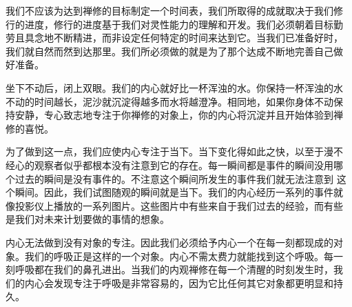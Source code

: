 我们不应该为达到禅修的目标制定一个时间表，我们所取得的成就取决于我们修
行的进度，修行的进度基于我们对灵性能力的理解和开发。我们必须朝着目标勤
劳且具念地不断精进，而非设定任何特定的时间来达到它。当我们已准备好时，
我们就自然而然到达那里。我们所必须做的就是为了那个达成不断地完善自己做
好准备。

坐下不动后，闭上双眼。我们的内心就好比一杯浑浊的水。你保持一杯浑浊的水
不动的时间越长，泥沙就沉淀得越多而水将越澄净。相同地，如果你身体不动保
持安静，专心致志地专注于你禅修的对象上，你的内心将沉淀并且开始体验到禅
修的喜悦。

为了做到这一点，我们应使内心专注于当下。当下变化得如此之快，以至于漫不
经心的观察者似乎都根本没有注意到它的存在。每一瞬间都是事件的瞬间没用哪
个过去的瞬间是没有事件的。不注意这个瞬间所发生的事件我们就无法注意到
这个瞬间。因此，我们试图随观的瞬间就是当下。我们的内心经历一系列的事件就
像投影仪上播放的一系列图片。这些图片中有些来自于我们过去的经验，而有些
是我们对未来计划要做的事情的想象。

内心无法做到没有对象的专注。因此我们必须给予内心一个在每一刻都现成的对
象。我们的呼吸正是这样的一个对象。内心不需太费力就能找到这个呼吸。每一
刻呼吸都在我们的鼻孔进出。当我们的内观禅修在每一个清醒的时刻发生时，我
们的内心会发现专注于呼吸是非常容易的，因为它比任何其它对象都更明显和持
久。

\endchapter

\byebye
